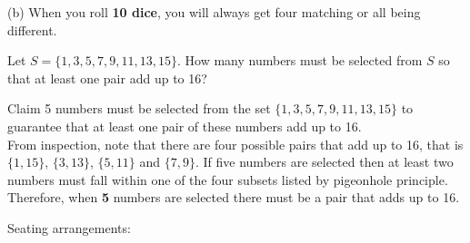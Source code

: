 \begin{questions}
\begin{solution}
    (b) When you roll \textbf{10 dice}, you will always get four matching or all being different. 
  \end{solution}


 Let $S = \{1, 3, 5, 7, 9, 11, 13, 15\}$. How many numbers must be selected from $S$ so that at least one pair add up to 16?
    \ifprintanswers
        \vspace{-10pt}
    \fi
    \begin{solution}
    Claim 5 numbers must be selected from the set
    $\{1, 3, 5, 7, 9, 11, 13, 15\}$ to guarantee that at least one
    pair of these numbers add up to 16. \\
    From inspection, note that there are four possible pairs that add
    up to 16, that is $\{1, 15\}$, $\{3, 13\}$, $\{5, 11\}$ and
    $\{7, 9\}$.  If five numbers are selected then at least two
    numbers must fall within one of the four subsets listed by
    pigeonhole principle.  Therefore, when \textbf{5} numbers are selected
    there must be a pair that adds up to 16.
    \end{solution}




 Seating arrangements:
\end{questions}
